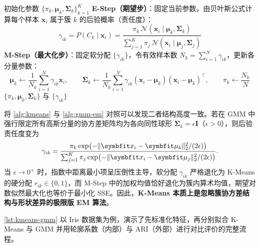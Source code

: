 \begin{algorithm}\label{alg:gmm-em}
\begin{algsteps}
  \State 初始化参数 $\{\pi_k, \bm{\mu}_k, \bm{\Sigma}_k\}_{k=1}^{K}$
  \Repeat
    \State \textbf{E-Step（期望步）}：固定当前参数，由贝叶斯公式计算每个样本 $\bm{x}_i$ 属于簇 $k$ 的后验概率（责任度）：
    \[
      \gamma_{ik} = P(C_k \mid \bm{x}_i)
      = \frac{\pi_k\,\mathcal{N}(\bm{x}_i \mid \bm{\mu}_k, \bm{\Sigma}_k)}{\sum_{j=1}^{K}\pi_j\,\mathcal{N}(\bm{x}_i \mid \bm{\mu}_j, \bm{\Sigma}_j)}
    \]
    \State \textbf{M-Step（最大化步）}：固定软分配 $\{\gamma_{ik}\}$，令有效样本数 $N_k = \sum_{i=1}^{N}\gamma_{ik}$，更新各分量参数：
    \[
      \bm{\mu}_k \gets \frac{1}{N_k}\sum_{i=1}^{N}\gamma_{ik}\bm{x}_i,\qquad
      \bm{\Sigma}_k \gets \frac{1}{N_k}\sum_{i=1}^{N}\gamma_{ik}(\bm{x}_i - \bm{\mu}_k)(\bm{x}_i - \bm{\mu}_k)^\top,\qquad
      \pi_k \gets \frac{N_k}{N}
    \]
  \State \Return $\{\pi_k, \bm{\mu}_k, \bm{\Sigma}_k\}$ 与 $\{\gamma_{ik}\}$
\end{algsteps}
\end{algorithm}

\begin{remark}\label{rem:kmeans-as-em}
将 \cref{alg:kmeans} 与 \cref{alg:gmm-em} 对照可以发现二者结构高度一致。若在 GMM 中强行限定所有高斯分量的协方差矩阵均为各向同性球形 $\bm{\Sigma}_k = \epsilon\bm{I}$（$\epsilon > 0$），则后验责任度变为
\[
  \gamma_{ik} = \frac{\pi_k\exp\bigl(-\norm{\bm{x}_i - \bm{\mu}_k}_2^2 / (2\epsilon)\bigr)}{\sum_{j=1}^{K}\pi_j\exp\bigl(-\norm{\bm{x}_i - \bm{\mu}_j}_2^2 / (2\epsilon)\bigr)}.
\]
当 $\epsilon \to 0^+$ 时，指数中距离最小项呈压倒性主导，软分配 $\gamma_{ik}$ 严格退化为 K-Means 的硬分配 $r_{ik}\in\{0,1\}$，而 M-Step 中的加权均值恰好退化为簇内算术均值，期望对数似然最大化也等价于最小化 SSE。因此，\textbf{K-Means 本质上是忽略簇协方差结构与形状差异的极限版 EM 算法}。
\end{remark}

\cref{lst:kmeans-gmm} 以 Iris 数据集为例，演示了先标准化特征，再分别拟合 K-Means 与 GMM 并用轮廓系数（内部）与 ARI（外部）进行对比评价的完整流程。

